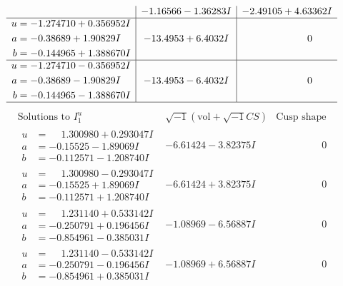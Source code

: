 \documentclass[1p]{elsarticle_modified}
\theoremstyle{definition}
\newcommand{\I}{\sqrt{-1}}
\begin{document}
$$\begin{array}{c|c|c}
 & -1.16566 - 1.36283 I & -2.49105 + 4.63362 I \\ \hline\begin{aligned}
u &= -1.274710 + 0.356952 I \\
a &= -0.38689 + 1.90829 I \\
b &= -0.144965 + 1.388670 I\end{aligned}
 & -13.4953 + 6.4032 I & \phantom{-0.000000 } 0 \\ \hline\begin{aligned}
u &= -1.274710 - 0.356952 I \\
a &= -0.38689 - 1.90829 I \\
b &= -0.144965 - 1.388670 I\end{aligned}
 & -13.4953 - 6.4032 I & \phantom{-0.000000 } 0\\
 \hline 
 \end{array}$$\newpage$$\begin{array}{c|c|c}  
\text{Solutions to }I^u_{1}& \I (\text{vol} + \sqrt{-1}CS) & \text{Cusp shape}\\
 \hline 
\begin{aligned}
u &= \phantom{-}1.300980 + 0.293047 I \\
a &= -0.15525 - 1.89069 I \\
b &= -0.112571 - 1.208740 I\end{aligned}
 & -6.61424 - 3.82375 I & \phantom{-0.000000 } 0 \\ \hline\begin{aligned}
u &= \phantom{-}1.300980 - 0.293047 I \\
a &= -0.15525 + 1.89069 I \\
b &= -0.112571 + 1.208740 I\end{aligned}
 & -6.61424 + 3.82375 I & \phantom{-0.000000 } 0 \\ \hline\begin{aligned}
u &= \phantom{-}1.231140 + 0.533142 I \\
a &= -0.250791 + 0.196456 I \\
b &= -0.854961 - 0.385031 I\end{aligned}
 & -1.08969 - 6.56887 I & \phantom{-0.000000 } 0 \\ \hline\begin{aligned}
u &= \phantom{-}1.231140 - 0.533142 I \\
a &= -0.250791 - 0.196456 I \\
b &= -0.854961 + 0.385031 I\end{aligned}
 & -1.08969 + 6.56887 I & \phantom{-0.000000 } 0 \\ \hline\begin{aligned}

\end{aligned}
\end{array}$$
\end{document}
